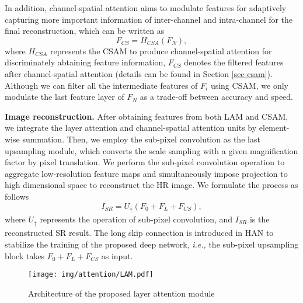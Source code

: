 \documentclass[runningheads]{llncs}
\begin{document}
	In addition, channel-spatial attention aims to modulate features for adaptively capturing more important information of inter-channel and intra-channel for the final reconstruction, which can be written as
\begin{equation}
	\mathit{F_{CS}}=H_{CSA}(F_N) ,
	\end{equation}
\noindent where $ H_{CSA} $ represents the CSAM to produce channel-spatial attention for discriminately abtaining feature information, $F_{CS}$ denotes the filtered features after channel-spatial attention (details can be found in Section \ref{sec-csam}). 
Although we can filter all the intermediate features of $F_i$ using CSAM, we only modulate the last feature layer of $F_N$ as a trade-off between accuracy and speed.







\textbf{Image reconstruction.} After obtaining features from both LAM and CSAM, we integrate the layer attention and channel-spatial attention units by element-wise summation.
Then, we employ the sub-pixel convolution \cite{shi2016real} as the last upsampling module,
which converts the scale sampling with a given magnification factor
by pixel translation.  We perform the sub-pixel convolution operation to aggregate low-resolution feature maps and simultaneously impose projection to high dimensional space to reconstruct the HR image. We formulate the process as follows
\begin{equation}
\mathit{I_{SR}}=U_{\uparrow}(F_0 + F_L + F_{CS}) ,
\end{equation}
where $ U_{\uparrow} $ represents the operation of sub-pixel convolution, and $ I_{SR} $ is the reconstructed SR result.
The long skip connection is introduced in HAN to stabilize the training of the proposed deep network, \textit{i.e.,} the sub-pixel upsampling block takes $F_0 + F_L + F_{CS}$ as input.




\begin{figure*}[t]\footnotesize
	\begin{center}
		\texttt{[image: img/attention/LAM.pdf]}
	\end{center}


	\caption{Architecture of the proposed layer attention module
}

	\label{fig-Layer_attention}
\end{figure*}
\end{document}
